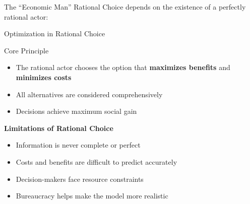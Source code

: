 \documentclass[10pt]{beamer}
\begin{document}
\begin{frame}{The ``Economic Man''}
Rational Choice depends on the existence of a perfectly rational actor:

\vspace{0.5cm}
\begin{center}
\end{center}
\end{frame}

\begin{frame}{Optimization in Rational Choice}
\begin{block}{Core Principle}
\begin{itemize}
\item The rational actor chooses the option that \textcolor{titanorange}{\textbf{maximizes benefits}} and \textcolor{titanorange}{\textbf{minimizes costs}}
\item All alternatives are considered comprehensively
\item Decisions achieve maximum social gain
\end{itemize}
\end{block}

\vspace{0.5cm}
\textbf{Limitations of Rational Choice}
\begin{itemize}
\item Information is never complete or perfect
\item Costs and benefits are difficult to predict accurately
\item Decision-makers face resource constraints
\item Bureaucracy helps make the model more realistic
\end{itemize}
\end{frame}
\end{document}
